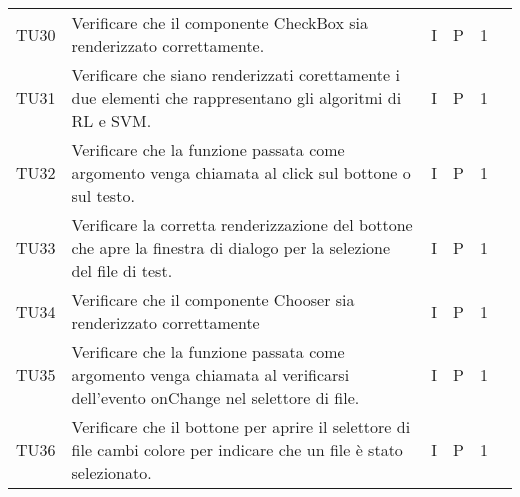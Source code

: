 \begin{longtable} {
		>{}p{12mm}
		>{}p{79.5mm}
		>{}p{9mm}
		>{}p{8mm}
		>{}p{14mm}
		>{}p{0mm}}
	TU30		& Verificare che il componente CheckBox sia renderizzato correttamente.& I & P & 1 &\TBstrut \\ [2mm]
	TU31		& Verificare che siano renderizzati corettamente i due elementi che rappresentano gli algoritmi di RL e SVM.& I & P & 1 &\TBstrut \\ [2mm]
	TU32		& Verificare che la funzione passata come argomento venga chiamata al click sul bottone o sul testo.& I & P & 1 &\TBstrut \\ [2mm]

	TU33    	& Verificare la corretta renderizzazione del bottone che apre la finestra di dialogo per la selezione del file di test. & I & P & 1 &\TBstrut \\ [2mm]
	TU34		& Verificare che il componente Chooser sia renderizzato correttamente& I & P & 1 &\TBstrut \\ [2mm]
	TU35    	& Verificare che la funzione passata come argomento venga chiamata al verificarsi dell'evento onChange nel selettore di file. & I & P & 1 &\TBstrut \\ [2mm]
	TU36    	& Verificare che il bottone per aprire il selettore di file cambi colore per indicare che un file è stato selezionato. & I & P & 1 &\TBstrut \\ [2mm]


\end{longtable}
